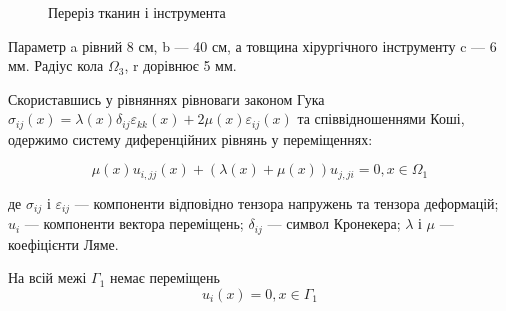 \begin{figure}[ht!]
    \centering
    
    \caption{Переріз тканин і інструмента}
    \label{fig:elasticity_2d_domain}
\end{figure}

\noindent Параметр a рівний 8 см, b --- 40 см, а товщина хірургічного інструменту c --- 6 мм. Радіус кола $\Omega_3$, r 
дорівнює 5 мм.

Скориставшись у рівняннях рівноваги законом Гука 
$\sigma_{ij}(x) = \lambda(x)\delta_{ij}\varepsilon_{kk}(x) + 2\mu(x)\varepsilon_{ij}(x)$ та співвідношеннями Коші, 
одержимо систему диференційних рівнянь у переміщеннях:

\begin{equation}
    \label{eqn:elasticity_2d_eqn}
    \mu(x)u_{i,jj}(x) + (\lambda(x) + \mu(x))u_{j,ji} = 0, x \in \Omega_1
\end{equation}

\noindent де $\sigma_{ij}$ і $\varepsilon_{ij}$ --- компоненти відповідно тензора напружень та тензора деформацій; $u_i$
--- компоненти вектора переміщень; $\delta_{ij}$ --- символ Кронекера; $\lambda$ і $\mu$ --- коефіцієнти Ляме.

\noindent На всій межі $\Gamma_1$ немає переміщень
\begin{equation}
    \label{eqn:elasticity_2d_cond_1}
    u_i(x) = 0, x \in \Gamma_1
\end{equation}

